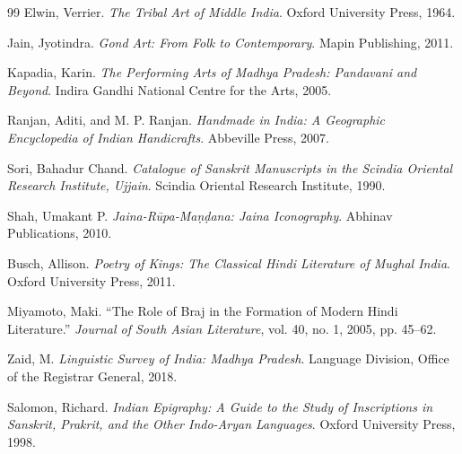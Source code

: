 \documentclass{article}
\begin{document}
\begin{thebibliography}{99}
  Elwin, Verrier. \textit{The Tribal Art of Middle India}. Oxford University Press, 1964.

  Jain, Jyotindra. \textit{Gond Art: From Folk to Contemporary}. Mapin Publishing, 2011.

  Kapadia, Karin. \textit{The Performing Arts of Madhya Pradesh: Pandavani and Beyond}. Indira Gandhi National Centre for the Arts, 2005.

  Ranjan, Aditi, and M. P. Ranjan. \textit{Handmade in India: A Geographic Encyclopedia of Indian Handicrafts}. Abbeville Press, 2007.

  Sori, Bahadur Chand. \textit{Catalogue of Sanskrit Manuscripts in the Scindia Oriental Research Institute, Ujjain}. Scindia Oriental Research Institute, 1990.

  Shah, Umakant P. \textit{Jaina-Rūpa-Maṇḍana: Jaina Iconography}. Abhinav Publications, 2010.

  Busch, Allison. \textit{Poetry of Kings: The Classical Hindi Literature of Mughal India}. Oxford University Press, 2011.

  Miyamoto, Maki. ``The Role of Braj in the Formation of Modern Hindi Literature.'' \textit{Journal of South Asian Literature}, vol. 40, no. 1, 2005, pp. 45–62.

  Zaid, M. \textit{Linguistic Survey of India: Madhya Pradesh}. Language Division, Office of the Registrar General, 2018.

  Salomon, Richard. \textit{Indian Epigraphy: A Guide to the Study of Inscriptions in Sanskrit, Prakrit, and the Other Indo-Aryan Languages}. Oxford University Press, 1998.

\end{thebibliography}
\end{document}
